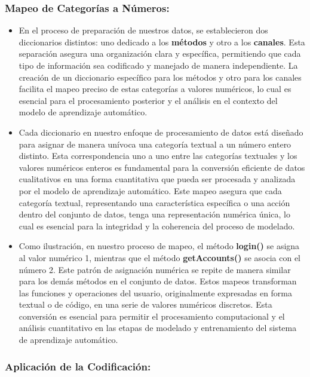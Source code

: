 \subsubsection{Mapeo de Categorías a Números:}

\begin{itemize}
    \item En el proceso de preparación de nuestros datos, se establecieron dos diccionarios distintos: uno dedicado a los \textbf{métodos} y otro a los \textbf{canales}. Esta separación asegura una organización clara y específica, permitiendo que cada tipo de información sea codificado y manejado de manera independiente. La creación de un diccionario específico para los métodos y otro para los canales facilita el mapeo preciso de estas categorías a valores numéricos, lo cual es esencial para el procesamiento posterior y el análisis en el contexto del modelo de aprendizaje automático.
    \item Cada diccionario en nuestro enfoque de procesamiento de datos está diseñado para asignar de manera unívoca una categoría textual a un número entero distinto. Esta correspondencia uno a uno entre las categorías textuales y los valores numéricos enteros es fundamental para la conversión eficiente de datos cualitativos en una forma cuantitativa que pueda ser procesada y analizada por el modelo de aprendizaje automático. Este mapeo asegura que cada categoría textual, representando una característica específica o una acción dentro del conjunto de datos, tenga una representación numérica única, lo cual es esencial para la integridad y la coherencia del proceso de modelado.
    \item Como ilustración, en nuestro proceso de mapeo, el método \textbf{login()} se asigna al valor numérico 1, mientras que el método \textbf{getAccounts()} se asocia con el número 2. Este patrón de asignación numérica se repite de manera similar para los demás métodos en el conjunto de datos. Estos mapeos transforman las funciones y operaciones del usuario, originalmente expresadas en forma textual o de código, en una serie de valores numéricos discretos. Esta conversión es esencial para permitir el procesamiento computacional y el análisis cuantitativo en las etapas de modelado y entrenamiento del sistema de aprendizaje automático.
\end{itemize}

\subsubsection{Aplicación de la Codificación:}

